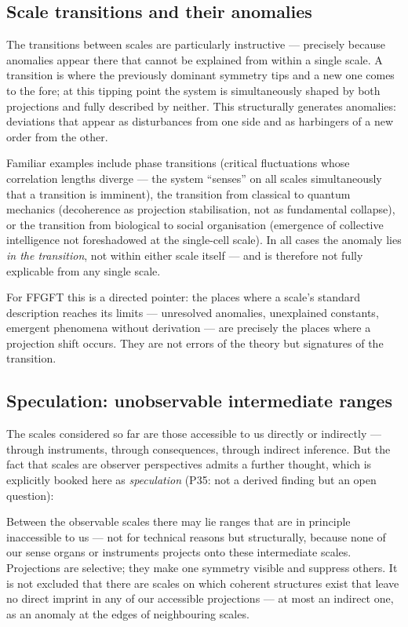 \subsection*{Scale transitions and their anomalies}

The transitions between scales are particularly instructive --- precisely
because anomalies appear there that cannot be explained from within a single
scale. A transition is where the previously dominant symmetry tips and a new
one comes to the fore; at this tipping point the system is simultaneously
shaped by both projections and fully described by neither. This structurally
generates anomalies: deviations that appear as disturbances from one side and
as harbingers of a new order from the other.

Familiar examples include phase transitions (critical fluctuations whose
correlation lengths diverge --- the system \enquote{senses} on all scales
simultaneously that a transition is imminent), the transition from classical to
quantum mechanics (decoherence as projection stabilisation, not as fundamental
collapse), or the transition from biological to social organisation (emergence
of collective intelligence not foreshadowed at the single-cell scale). In all
cases the anomaly lies \emph{in the transition}, not within either scale
itself --- and is therefore not fully explicable from any single scale.

For FFGFT this is a directed pointer: the places where a scale's standard
description reaches its limits --- unresolved anomalies, unexplained constants,
emergent phenomena without derivation --- are precisely the places where a
projection shift occurs. They are not errors of the theory but signatures of
the transition.

\subsection*{Speculation: unobservable intermediate ranges}

The scales considered so far are those accessible to us directly or indirectly
--- through instruments, through consequences, through indirect inference. But
the fact that scales are observer perspectives admits a further thought, which
is explicitly booked here as \emph{speculation} (P35: not a derived finding
but an open question):

Between the observable scales there may lie ranges that are in principle
inaccessible to us --- not for technical reasons but structurally, because
none of our sense organs or instruments projects onto these intermediate
scales. Projections are selective; they make one symmetry visible and suppress
others. It is not excluded that there are scales on which coherent structures
exist that leave no direct imprint in any of our accessible projections ---
at most an indirect one, as an anomaly at the edges of neighbouring scales.

